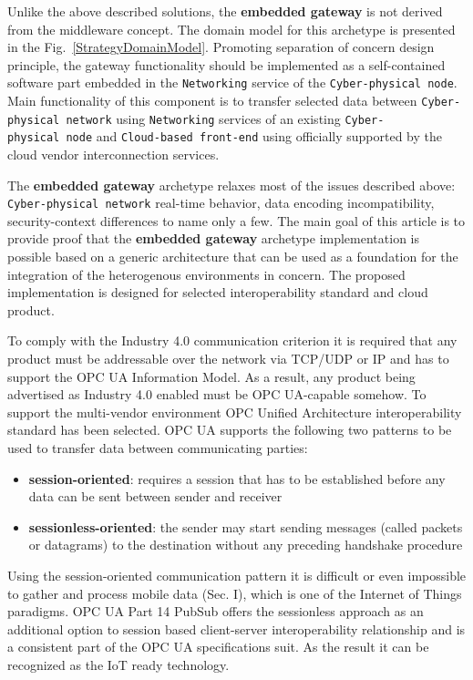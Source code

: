 \documentclass{jacsart}
\providecommand{\tightlist} { \setlength{\itemsep}{0pt}\setlength{\parskip}{0pt}}
\begin{document}
Unlike the above described solutions, the \textbf{embedded gateway} is not derived from the middleware concept. The domain model for this archetype is presented in the Fig.~\ref*{StrategyDomainModel}. Promoting separation of concern design principle, the gateway functionality should be implemented as a self-contained software part embedded in the \texttt{Networking} service of the \texttt{Cyber-physical\ node}. Main functionality of this component is to transfer selected data between \texttt{Cyber-physical\ network} using \texttt{Networking} services of an existing \texttt{Cyber-physical\ node} and \texttt{Cloud-based\ front-end} using officially supported by the cloud vendor interconnection services.

The \textbf{embedded gateway} archetype relaxes most of the issues described above: \texttt{Cyber-physical\ network} real-time behavior, data encoding incompatibility, security-context differences to name only a few. The main goal of this article is to provide proof that the \textbf{embedded gateway} archetype implementation is possible based on a generic architecture that can be used as a foundation for the integration of the heterogenous environments in concern. The proposed implementation is designed for selected interoperability standard and cloud product.

To comply with the Industry 4.0 communication criterion it is required that any product must be addressable over the network via TCP/UDP or IP and has to support the OPC UA Information Model. As a result, any product being advertised as Industry 4.0 enabled must be OPC UA-capable somehow. To support the multi-vendor environment OPC Unified Architecture interoperability standard has been selected. OPC UA supports the following two patterns to be used to transfer data between communicating parties:

\begin{itemize}
      \tightlist
      \item \textbf{session-oriented}: requires a session that has to be established before any data can be sent between sender and receiver
      \item \textbf{sessionless-oriented}: the sender may start sending messages (called packets or datagrams) to the destination without any preceding handshake procedure
\end{itemize}

Using the session-oriented communication pattern it is difficult or
even impossible to gather and process mobile data (Sec. I), which is one
of the Internet of Things paradigms. OPC UA Part 14 PubSub \cite{RefWorks:doc:5d98837de4b055984c0eecf0}  offers the sessionless approach as an additional option to session based client-server interoperability relationship and is a consistent part of the OPC UA specifications suit. As the result it can be recognized as the IoT ready technology.
\end{document}
